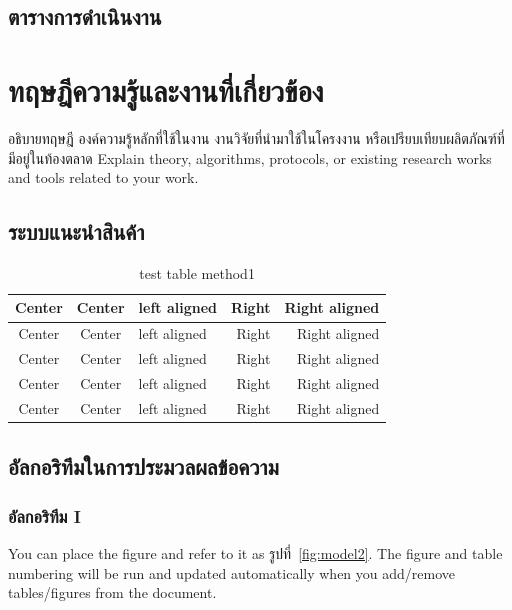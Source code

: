 \documentclass[12pt,oneside,openright,a4paper]{cpe-thai-project}
\begin{document}
\section{ตารางการดำเนินงาน}

\chapter{ทฤษฎีความรู้และงานที่เกี่ยวข้อง}

อธิบายทฤษฎี องค์ความรู้หลักที่ใช้ในงาน งานวิจัยที่นำมาใช้ในโครงงาน หรือเปรียบเทียบผลิตภัณฑ์ที่มีอยู่ในท้องตลาด
Explain theory, algorithms, protocols, or existing research works and tools related to your work. 

\section{ระบบแนะนำสินค้า}

\begin{table}[!h]
\caption{test table method1}\label{tbl:method1}
\begin{tabular}{c|c|l|rr} \hline\hline
Center & Center & left aligned & Right & Right aligned \\ \hline\hline
Center & Center & left aligned & Right & Right aligned \\ \hline
Center & Center & left aligned & Right & Right aligned \\ 
Center & Center & left aligned & Right & Right aligned \\ \hline
Center & Center & left aligned & Right & Right aligned \\ \hline\hline
\end{tabular}
\end{table}


\section{อัลกอริทึมในการประมวลผลข้อความ}
\subsection{อัลกอริทึม I}

You can place the figure and refer to it as รูปที่~\ref{fig:model2}.
The figure and table numbering will be run and updated automatically when you add/remove tables/figures from the document.
\end{document}
